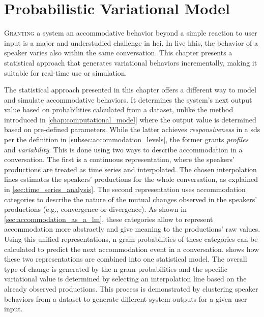\chapter{Probabilistic Variational Model}
\label{chap:statistical_model}

\lettrine{G}{ranting} a system an accommodative behavior beyond a simple reaction to user input is a major and understudied challenge in \acs{hci}.
In live \acsp{hhi}, the behavior of a speaker varies also within the same conversation.
This chapter presents a statistical approach that generates variational behaviors incrementally, making it suitable for real-time use or simulation.

\pagebreak

The statistical approach presented in this chapter offers a different way to model and simulate accommodative behaviors.
It determines the system's next output value based on probabilities calculated from a dataset, unlike the method introduced in \cref{chap:computational_model} where the output value is determined based on pre-defined parameters.
While the latter achieves \emph{responsiveness} in a \ac{sds} per the definition in \cref{subsec:accommodation_levels}, the former grants \emph{profiles} and \emph{variability}.
This is done using two ways to describe accommodation in a conversation.
The first is a continuous representation, where the speakers' productions are treated as time series and interpolated.
The chosen interpolation lines estimates the speakers' productions for the whole conversation, as explained in \cref{sec:time_series_analysis}.
The second representation uses accommodation categories to describe the nature of the mutual changes observed in the speakers' productions (e.g., convergence or divergence).
As shown in \cref{sec:accommodation_as_a_lm}, these categories allow to represent accommodation more abstractly and give meaning to the productions' raw values.
Using this unified representations, n-gram probabilities of these categories can be calculated to predict the next accommodation event in a conversation.
 shows how these two representations are combined into one statistical model.
The overall type of change is generated by the n-gram probabilities and the specific variational value is determined by selecting an interpolation line based on the already observed productions.
This process is demonstrated by clustering speaker behaviors from a dataset to generate different system outputs for a given user input.

